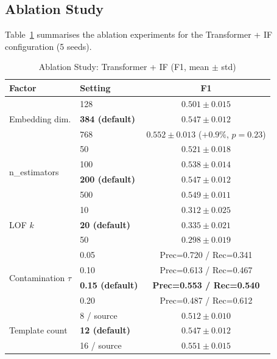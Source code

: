 \documentclass[conference]{IEEEtran}
\begin{document}
\subsection{Ablation Study}
\label{sec:ablation}

Table~\ref{tab:ablation} summarises the ablation experiments for the
Transformer + IF configuration (5 seeds).

\begin{table}[htbp]
\centering
\caption{Ablation Study: Transformer + IF (F1, mean $\pm$ std)}
\label{tab:ablation}
\renewcommand{\arraystretch}{1.2}
\begin{tabular}{@{}llc@{}}
\toprule
\textbf{Factor} & \textbf{Setting} & \textbf{F1} \\
\midrule
\multirow{3}{*}{Embedding dim.}
  & 128  & $0.501 \pm 0.015$ \\
  & \textbf{384 (default)} & $\mathbf{0.547 \pm 0.012}$ \\
  & 768  & $0.552 \pm 0.013$ ($+0.9\%$, $p=0.23$) \\
\midrule
\multirow{4}{*}{n\_estimators}
  & 50   & $0.521 \pm 0.018$ \\
  & 100  & $0.538 \pm 0.014$ \\
  & \textbf{200 (default)} & $\mathbf{0.547 \pm 0.012}$ \\
  & 500  & $0.549 \pm 0.011$ \\
\midrule
\multirow{3}{*}{LOF $k$}
  & 10   & $0.312 \pm 0.025$ \\
  & \textbf{20 (default)} & $\mathbf{0.335 \pm 0.021}$ \\
  & 50   & $0.298 \pm 0.019$ \\
\midrule
\multirow{4}{*}{Contamination $\tau$}
  & 0.05 & Prec=0.720 / Rec=0.341 \\
  & 0.10 & Prec=0.613 / Rec=0.467 \\
  & \textbf{0.15 (default)} & \textbf{Prec=0.553 / Rec=0.540} \\
  & 0.20 & Prec=0.487 / Rec=0.612 \\
\midrule
\multirow{3}{*}{Template count}
  & 8 / source   & $0.512 \pm 0.010$ \\
  & \textbf{12 (default)} & $\mathbf{0.547 \pm 0.012}$ \\
  & 16 / source  & $0.551 \pm 0.015$ \\
\bottomrule
\end{tabular}
\end{table}

\end{document}
